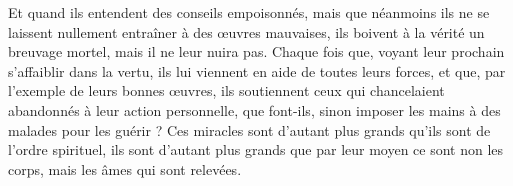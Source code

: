 Et quand ils entendent des conseils empoisonnés, mais que néanmoins ils ne se laissent nullement entraîner à des œuvres mauvaises, ils boivent à la vérité un breuvage mortel, mais il ne leur nuira pas. Chaque fois que, voyant leur prochain s’affaiblir dans la vertu, ils lui viennent en aide de toutes leurs forces, et que, par l’exemple de leurs bonnes œuvres, ils soutiennent ceux qui chancelaient abandonnés à leur action personnelle, que font-ils, sinon imposer les mains à des malades pour les guérir ? Ces miracles sont d’autant plus grands qu’ils sont de l’ordre spirituel, ils sont d’autant plus grands que par leur moyen ce sont non les corps, mais les âmes qui sont relevées.